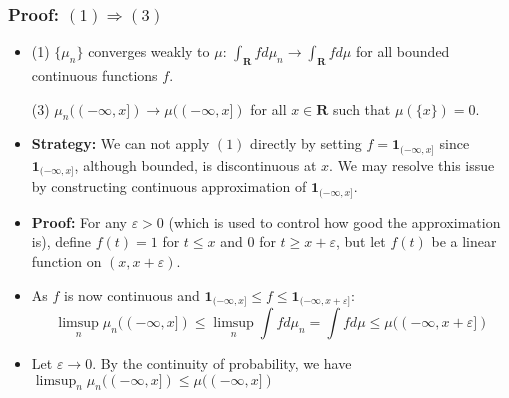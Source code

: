 \documentclass[handout]{beamer}
\newcommand{\BI}{\mathbf{1}}
\begin{document}
\frame
{
  \frametitle{Proof: $(1) \Rightarrow (3)$ } 

   \begin{itemize}

\item<1->
               
                (1)  $\{\mu_n\}$ converges weakly to $\mu$:  $\int_{\mathbf{R}} f d\mu_n \rightarrow \int_{\mathbf{R}}f d\mu$ for all bounded continuous functions $f$.
                              \vspace{2mm}


               {\color{blue}  (3) $\mu_n((-\infty, x])\rightarrow \mu((-\infty, x])$ for all $x\in \mathbf{R}$ such that $\mu(\{x\})=0$.}
                                            \vspace{2mm}

               
               
               
                     \item<2-> \textbf{Strategy:}  We can not apply $(1)$ directly by setting $f=\BI_{(-\infty, x]}$ since $\BI_{(-\infty, x]}$, although bounded, is discontinuous at $x$. We may resolve this issue by  constructing continuous approximation  of $\BI_{(-\infty, x]}$. 
                     
                     \item<3-> \textbf{Proof:} For any $\varepsilon>0$ (which is used to control how good the approximation is), define $f(t)=1$ for $t\leq x$ and $0$ for $t\geq x+\varepsilon$, but let $f(t)$ be a linear function on $(x, x+\varepsilon)$. 
                     \item<4->[-]  As $f$ is now continuous and $\BI_{(-\infty, x]} \leq f \leq \BI_{(-\infty, x+\varepsilon]}$:
                     $$\limsup_n \mu_n((-\infty, x]) \leq \limsup_n \int f d\mu_n=\int f d\mu \leq \mu((-\infty, x+\varepsilon])$$
                     
                     \item<5->[-] Let $\varepsilon\rightarrow 0$. By the continuity of probability, we have $\limsup_n \mu_n((-\infty, x]) \leq \mu((-\infty, x])$
                     
                                         
                                               \end{itemize}
}
\end{document}
